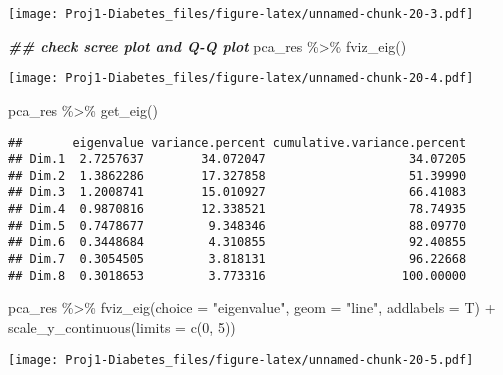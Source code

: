 \documentclass[
]{article}
\newenvironment{Shaded}{\begin{snugshade}}{\end{snugshade}}
\newcommand{\AttributeTok}[1]{\textcolor[rgb]{0.77,0.63,0.00}{#1}}
\newcommand{\DecValTok}[1]{\textcolor[rgb]{0.00,0.00,0.81}{#1}}
\newcommand{\DocumentationTok}[1]{\textcolor[rgb]{0.56,0.35,0.01}{\textbf{\textit{#1}}}}
\newcommand{\FunctionTok}[1]{\textcolor[rgb]{0.00,0.00,0.00}{#1}}
\newcommand{\NormalTok}[1]{#1}
\newcommand{\SpecialCharTok}[1]{\textcolor[rgb]{0.00,0.00,0.00}{#1}}
\newcommand{\StringTok}[1]{\textcolor[rgb]{0.31,0.60,0.02}{#1}}
\begin{document}
\texttt{[image: Proj1-Diabetes\_files/figure-latex/unnamed-chunk-20-3.pdf]}

\begin{Shaded}
\begin{Highlighting}[]
\DocumentationTok{\#\# check scree plot and Q{-}Q plot}
\NormalTok{pca\_res }\SpecialCharTok{\%\textgreater{}\%} \FunctionTok{fviz\_eig}\NormalTok{()}
\end{Highlighting}
\end{Shaded}

\texttt{[image: Proj1-Diabetes\_files/figure-latex/unnamed-chunk-20-4.pdf]}

\begin{Shaded}
\begin{Highlighting}[]
\NormalTok{pca\_res }\SpecialCharTok{\%\textgreater{}\%} \FunctionTok{get\_eig}\NormalTok{()}
\end{Highlighting}
\end{Shaded}

\begin{verbatim}
##       eigenvalue variance.percent cumulative.variance.percent
## Dim.1  2.7257637        34.072047                    34.07205
## Dim.2  1.3862286        17.327858                    51.39990
## Dim.3  1.2008741        15.010927                    66.41083
## Dim.4  0.9870816        12.338521                    78.74935
## Dim.5  0.7478677         9.348346                    88.09770
## Dim.6  0.3448684         4.310855                    92.40855
## Dim.7  0.3054505         3.818131                    96.22668
## Dim.8  0.3018653         3.773316                   100.00000
\end{verbatim}

\begin{Shaded}
\begin{Highlighting}[]
\NormalTok{pca\_res }\SpecialCharTok{\%\textgreater{}\%} \FunctionTok{fviz\_eig}\NormalTok{(}\AttributeTok{choice =} \StringTok{"eigenvalue"}\NormalTok{,}
             \AttributeTok{geom =} \StringTok{"line"}\NormalTok{,}
             \AttributeTok{addlabels =}\NormalTok{ T) }\SpecialCharTok{+}
             \FunctionTok{scale\_y\_continuous}\NormalTok{(}\AttributeTok{limits =} \FunctionTok{c}\NormalTok{(}\DecValTok{0}\NormalTok{, }\DecValTok{5}\NormalTok{))}
\end{Highlighting}
\end{Shaded}

\texttt{[image: Proj1-Diabetes\_files/figure-latex/unnamed-chunk-20-5.pdf]}
\end{document}
